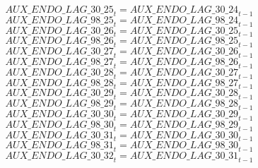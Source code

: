 \begin{dmath}
{AUX\_ENDO\_LAG\_30\_25}_{t}={AUX\_ENDO\_LAG\_30\_24}_{t-1}
\end{dmath}
\begin{dmath}
{AUX\_ENDO\_LAG\_98\_25}_{t}={AUX\_ENDO\_LAG\_98\_24}_{t-1}
\end{dmath}
\begin{dmath}
{AUX\_ENDO\_LAG\_30\_26}_{t}={AUX\_ENDO\_LAG\_30\_25}_{t-1}
\end{dmath}
\begin{dmath}
{AUX\_ENDO\_LAG\_98\_26}_{t}={AUX\_ENDO\_LAG\_98\_25}_{t-1}
\end{dmath}
\begin{dmath}
{AUX\_ENDO\_LAG\_30\_27}_{t}={AUX\_ENDO\_LAG\_30\_26}_{t-1}
\end{dmath}
\begin{dmath}
{AUX\_ENDO\_LAG\_98\_27}_{t}={AUX\_ENDO\_LAG\_98\_26}_{t-1}
\end{dmath}
\begin{dmath}
{AUX\_ENDO\_LAG\_30\_28}_{t}={AUX\_ENDO\_LAG\_30\_27}_{t-1}
\end{dmath}
\begin{dmath}
{AUX\_ENDO\_LAG\_98\_28}_{t}={AUX\_ENDO\_LAG\_98\_27}_{t-1}
\end{dmath}
\begin{dmath}
{AUX\_ENDO\_LAG\_30\_29}_{t}={AUX\_ENDO\_LAG\_30\_28}_{t-1}
\end{dmath}
\begin{dmath}
{AUX\_ENDO\_LAG\_98\_29}_{t}={AUX\_ENDO\_LAG\_98\_28}_{t-1}
\end{dmath}
\begin{dmath}
{AUX\_ENDO\_LAG\_30\_30}_{t}={AUX\_ENDO\_LAG\_30\_29}_{t-1}
\end{dmath}
\begin{dmath}
{AUX\_ENDO\_LAG\_98\_30}_{t}={AUX\_ENDO\_LAG\_98\_29}_{t-1}
\end{dmath}
\begin{dmath}
{AUX\_ENDO\_LAG\_30\_31}_{t}={AUX\_ENDO\_LAG\_30\_30}_{t-1}
\end{dmath}
\begin{dmath}
{AUX\_ENDO\_LAG\_98\_31}_{t}={AUX\_ENDO\_LAG\_98\_30}_{t-1}
\end{dmath}
\begin{dmath}
{AUX\_ENDO\_LAG\_30\_32}_{t}={AUX\_ENDO\_LAG\_30\_31}_{t-1}
\end{dmath}
